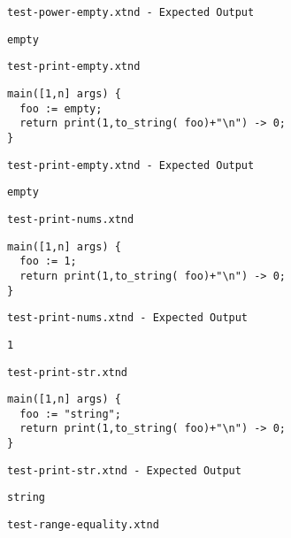 \medskip \noindent \texttt{test-power-empty.xtnd - Expected Output}


\begin{lstlisting}
empty
\end{lstlisting}


\medskip \noindent \texttt{test-print-empty.xtnd}


\begin{lstlisting}
main([1,n] args) {
  foo := empty;
  return print(1,to_string( foo)+"\n") -> 0;
}
\end{lstlisting}


\medskip \noindent \texttt{test-print-empty.xtnd - Expected Output}


\begin{lstlisting}
empty
\end{lstlisting}


\medskip \noindent \texttt{test-print-nums.xtnd}


\begin{lstlisting}
main([1,n] args) {
  foo := 1;
  return print(1,to_string( foo)+"\n") -> 0;
}
\end{lstlisting}


\medskip \noindent \texttt{test-print-nums.xtnd - Expected Output}


\begin{lstlisting}
1
\end{lstlisting}


\medskip \noindent \texttt{test-print-str.xtnd}


\begin{lstlisting}
main([1,n] args) {
  foo := "string";
  return print(1,to_string( foo)+"\n") -> 0;
}
\end{lstlisting}


\medskip \noindent \texttt{test-print-str.xtnd - Expected Output}


\begin{lstlisting}
string
\end{lstlisting}


\medskip \noindent \texttt{test-range-equality.xtnd}


